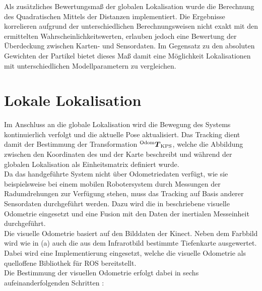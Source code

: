 Als zusätzliches Bewertungsmaß der globalen Lokalisation wurde die Berechnung des Quadratischen Mittels der Distanzen implementiert. Die Ergebnisse korrelieren aufgrund der unterschiedlichen Berechnungsweisen nicht exakt mit den ermittelten Wahrscheinlichkeitswerten, erlauben jedoch eine Bewertung der Überdeckung zwischen Karten- und Sensordaten. Im Gegensatz zu den absoluten Gewichten der Partikel bietet dieses Maß damit eine Möglichkeit Lokalisationen mit unterschiedlichen Modellparametern zu vergleichen.

\prever{
}

\section{Lokale Lokalisation}
\label{locloc}
Im Anschluss an die globale Lokalisation wird die Bewegung des Systems kontinuierlich verfolgt und die aktuelle Pose aktualisiert. Das Tracking dient damit der Bestimmung der Transformation ${^{\mathrm{Odom}}\mbox{\boldmath{$T$}}_{\mathrm{KPS}}}$, welche die Abbildung zwischen den Koordinaten des  und der Karte beschreibt und während der globalen Lokalisation als Einheitsmatrix definiert wurde.\\

Da das handgeführte System nicht über Odometriedaten verfügt, wie sie beispielsweise bei einem mobilen Robotersystem durch Messungen der Radumdrehungen zur Verfügung stehen, muss das Tracking auf Basis anderer Sensordaten durchgeführt werden. Dazu wird die in  beschriebene visuelle Odometrie eingesetzt und eine Fusion mit den Daten der inertialen Messeinheit durchgeführt.\\

Die visuelle Odometrie basiert auf den Bilddaten der Kinect. Neben dem Farbbild wird wie in  (a) auch die aus dem Infrarotbild bestimmte Tiefenkarte ausgewertet. Dabei wird eine Implementierung \cite{Fovis} eingesetzt, welche die visuelle Odometrie als quelloffene Bibliothek für ROS bereitstellt.\\
Die Bestimmung der visuellen Odometrie erfolgt dabei in sechs aufeinanderfolgenden Schritten \cite{Huang2011}:

